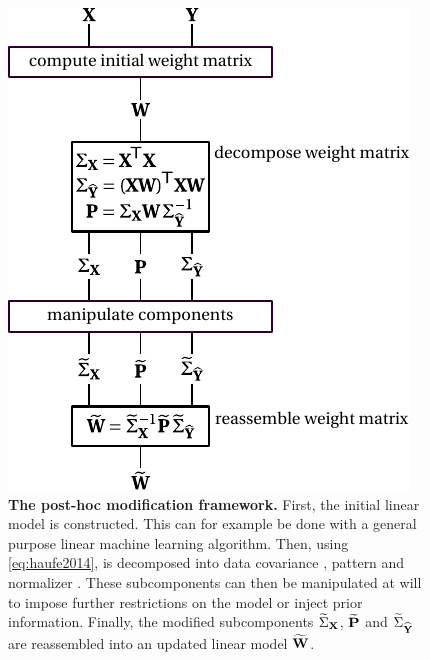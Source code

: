 \documentclass[a4paper]{vanvliet_paper}
\newcommand{\modcov}{\widetilde{\Sigma}_{\mat{X}}}
\newcommand{\modpat}{\widetilde{\mat{P}}}
\newcommand{\modnorm}{\widetilde{\Sigma}_{\emat{Y}}}
\newcommand{\modweights}{\widetilde{\mat{W}}}
\newcommand{\tmodcov}{$\modcov$\xspace}
\newcommand{\tmodpat}{$\modpat$\xspace}
\newcommand{\tmodnorm}{$\modnorm$\xspace}
\newcommand{\tmodweights}{$\modweights$\xspace}
\begin{document}
\begin{figure}
    \includegraphics{figures/posthoc.pdf}
    \caption{\textbf{The post-hoc modification framework.}
    First, the initial linear model  is constructed. This can for example be done with a general purpose linear machine learning algorithm. Then, using \autoref{eq:haufe2014},  is decomposed into data covariance , pattern  and normalizer . These subcomponents can then be manipulated at will to impose further restrictions on the model or inject prior information. Finally, the modified subcomponents \tmodcov, \tmodpat and \tmodnorm are reassembled into an updated linear model \tmodweights.
    }\label{fig:posthoc}
\end{figure}
\end{document}
